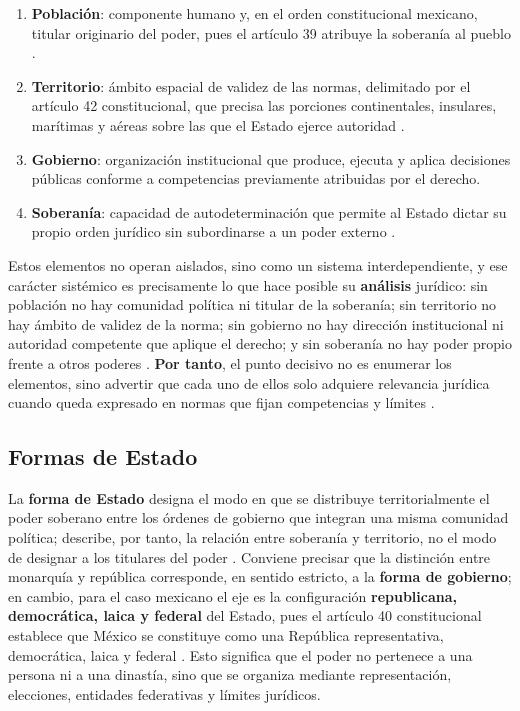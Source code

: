 \documentclass[
spanish,
letterpaper, oneside
]{article}
\begin{document}
	\begin{enumerate}
		\item \textbf{Población}: componente humano y, en el orden constitucional mexicano, titular originario del poder, pues el artículo 39 atribuye la soberanía al pueblo \citep{cpeum2026}.
		\item \textbf{Territorio}: ámbito espacial de validez de las normas, delimitado por el artículo 42 constitucional, que precisa las porciones continentales, insulares, marítimas y aéreas sobre las que el Estado ejerce autoridad \citep{cpeum2026}.
		\item \textbf{Gobierno}: organización institucional que produce, ejecuta y aplica decisiones públicas conforme a competencias previamente atribuidas por el derecho.
		\item \textbf{Soberanía}: capacidad de autodeterminación que permite al Estado dictar su propio orden jurídico sin subordinarse a un poder externo \citep{paredes2020}.
	\end{enumerate}
	
	Estos elementos no operan aislados, sino como un sistema interdependiente, y ese carácter sistémico es precisamente lo que hace posible su \textbf{análisis} jurídico: sin población no hay comunidad política ni titular de la soberanía; sin territorio no hay ámbito de validez de la norma; sin gobierno no hay dirección institucional ni autoridad competente que aplique el derecho; y sin soberanía no hay poder propio frente a otros poderes \citep{paredes2020}. \textbf{Por tanto}, el punto decisivo no es enumerar los elementos, sino advertir que cada uno de ellos solo adquiere relevancia jurídica cuando queda expresado en normas que fijan competencias y límites \citep{kelsen1982}.
	
	\subsection{Formas de Estado}
	
	La \textbf{forma de Estado} designa el modo en que se distribuye territorialmente el poder soberano entre los órdenes de gobierno que integran una misma comunidad política; describe, por tanto, la relación entre soberanía y territorio, no el modo de designar a los titulares del poder \citep{paredes2020}. Conviene precisar que la distinción entre monarquía y república corresponde, en sentido estricto, a la \textbf{forma de gobierno}; en cambio, para el caso mexicano el eje es la configuración \textbf{republicana, democrática, laica y federal} del Estado, pues el artículo 40 constitucional establece que México se constituye como una República representativa, democrática, laica y federal \citep{cpeum2026}. Esto significa que el poder no pertenece a una persona ni a una dinastía, sino que se organiza mediante representación, elecciones, entidades federativas y límites jurídicos.
	
\end{document}
